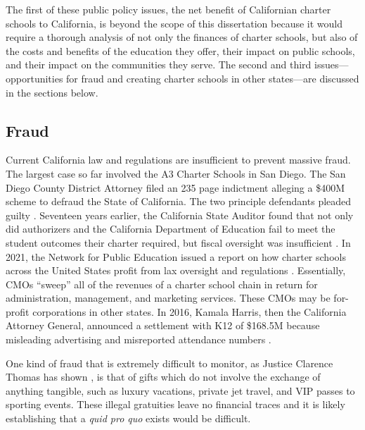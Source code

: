 The first of these public policy issues, the net benefit of Californian charter schools to California, is beyond the scope of this dissertation because it would require a thorough analysis of not only the finances of charter schools, but also of the costs and benefits of the education they offer, their impact on public schools, and their impact on the communities they serve. The second and third issues—opportunities for fraud and creating charter schools in other states—are discussed in the sections below.

\subsection{Fraud}%
\label{sec:fraud}\indent%

Current California law and regulations are insufficient to prevent massive fraud. The largest case so far involved the A3 Charter Schools in San Diego. The San Diego County District Attorney filed an 235 page indictment \parencite{SDDA2019} alleging a \$400M scheme to defraud the State of California. The two principle defendants pleaded guilty \parencite{Taketa2021}.
Seventeen years earlier, the California State Auditor found that not only did authorizers and the California Department of Education fail to meet the student outcomes their charter required, but fiscal oversight was insufficient \parencite{CAStateAuditor2002}. In 2021, the Network for Public Education issued a report on how charter schools across the United States profit from lax oversight and regulations \parencite{Burris.Cimarusti2021}. Essentially, CMOs ``sweep'' all of the revenues of a charter school chain in return for administration, management, and marketing services. These CMOs may be for-profit corporations in other states. In 2016, Kamala Harris, then the California Attorney General, announced a settlement with K12 of \$168.5M because misleading advertising and misreported attendance numbers \parencite{AGpressoffice2016}.

One kind of fraud that is extremely difficult to monitor, as Justice Clarence Thomas has shown \parencite{Murphy.Mierjeski2023}, is that of gifts which do not involve the exchange of anything tangible, such as luxury vacations, private jet travel, and VIP passes to sporting events. These illegal gratuities leave no financial traces and it is likely establishing that a \textit{quid pro quo} exists would be difficult.

